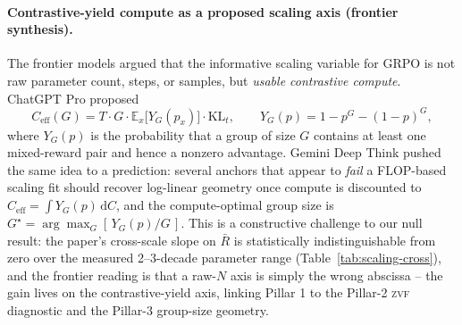 \documentclass{article}
\providecommand{\tableref}[1]{Table~\ref{#1}}
\begin{document}
\paragraph{Contrastive-yield compute as a proposed scaling axis (frontier synthesis).}
The frontier models argued that the informative scaling variable for GRPO is
not raw parameter count, steps, or samples, but \emph{usable contrastive
compute}. ChatGPT Pro proposed
\begin{equation}
  \label{eq:frontier-ceff}
  C_{\mathrm{eff}}(G) = T \cdot G \cdot
      \mathbb{E}_x\!\bigl[Y_G(p_x)\bigr] \cdot \mathrm{KL}_t,
  \qquad
  Y_G(p) = 1 - p^{G} - (1-p)^{G},
\end{equation}
where $Y_G(p)$ is the probability that a group of size $G$ contains at least
one mixed-reward pair and hence a nonzero advantage. Gemini Deep Think pushed
the same idea to a prediction: several anchors that appear to \emph{fail} a
FLOP-based scaling fit should recover log-linear geometry once compute is
discounted to $C_{\mathrm{eff}}=\int Y_G(p)\,\mathrm{d}C$, and the
compute-optimal group size is $G^\star = \arg\max_G [\,Y_G(p)/G\,]$. This is a
constructive challenge to our null result: the paper's cross-scale slope on
$\bar R$ is statistically indistinguishable from zero over the measured 2--3-decade
parameter range (\tableref{tab:scaling-cross}), and the frontier reading is that a
raw-$N$ axis is simply the wrong abscissa -- the gain lives on the
contrastive-yield axis, linking Pillar 1 to the Pillar-2 \textsc{zvf}
diagnostic and the Pillar-3 group-size geometry.
\end{document}
